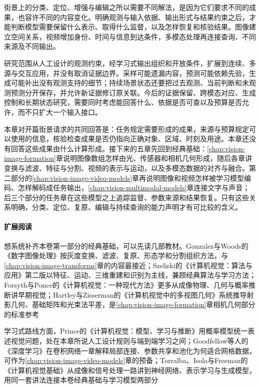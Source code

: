 街景上的分类、定位、增强与编辑之所以需要不同解法，是因为它们要求不同的成果，也容许不同的内容变化。明确观测与输入依据、输出形式与结果约束之后，才能判断模型需要保留什么表示、取得什么监督，以及怎样恢复和核验结果。图像建立空间关系，视频增加身份、时间与信息到达条件，多模态处理再连接查询、不同来源及不同输出。

研究范围从人工设计的观测约束，经学习式输出组织和开放条件，扩展到连续、多源与交互应用，并没有取消证据边界。采样可能遗漏内容，预测可能依赖先验，生成可能补出没有观测支持的细节；持续场景状态还要把过去观测、当前判断和未观测预测分开保存，并允许新证据修订原关联。今后的证据保留、跨模态对应、生成控制和长期状态研究，需要同时考虑能回答什么、依据是否可查以及预算是否允许，而不只扩大一个输入接口。

本章对开篇街景请求的共同回答是：任务规定需要形成的成果，来源与预算规定可以使用的信息，核验检查成果是否仍指向正确对象、区域、时刻及用途。本章还没有回答这些成果由什么计算形成。接下来的五章先回到经典基础：\ref{chap:vision-image-formation}章说明图像数组怎样由光、传感器和相机几何形成，随后各章讲变换与滤波、特征与分割、视频的表示与运动，以及多模态数据的对齐与融合。第二部分的\ref{chap:vision-image-video-models}章再说明图像和视频怎样被学习模型编码、怎样解码成任务输出，\ref{chap:vision-multimodal-models}章连接文字与声音；后三个部分的任务章在这些模型之上追踪监督、参数来源和结果恢复。只有这些关系明确，分类、定位、复原、编辑与持续查询的能力声明才有可比较的含义。

\paragraph{扩展阅读}
想系统补齐本卷第一部分的经典基础，可以先读几部教材。Gonzalez与Woods的《数字图像处理》按灰度变换、滤波、复原、形态学和分割组织方法，与\ref{chap:vision-image-transforms}章的内容最接近；Szeliski的《计算机视觉：算法与应用》第二版以特征、运动、三维重建和识别为主线，兼顾经典算法与学习方法；Forsyth与Ponce的《计算机视觉：一种现代方法》更多从成像物理、几何与概率推断讲早期视觉；Hartley与Zisserman的《计算机视觉中的多视图几何》系统推导射影几何、基础矩阵和光束法平差，是\ref{chap:vision-image-formation}章相机几何部分的标准参考

学习式路线方面，Prince的《计算机视觉：模型、学习与推断》用概率模型统一表述视觉问题，处在本章所说人工设计规则与端到端学习之间；Goodfellow等人的《深度学习》在卷积网络一章解释局部连接、参数共享和池化为何适合网格数据，可作为\ref{chap:vision-image-video-models}章的预备；Torralba、Isola与Freeman的《计算机视觉基础》从成像和信号处理一路讲到神经网络、表示学习与生成模型，用同一套讲法连接本卷经典基础与学习模型两部分

